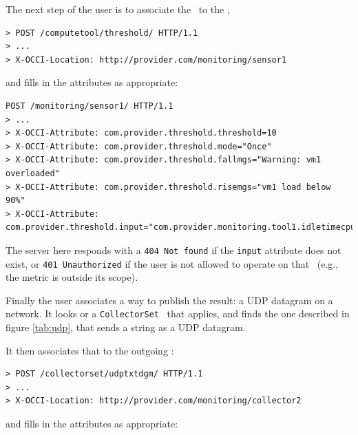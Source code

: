 \documentclass[12pt]{article}  %
\begin{document}
The next step of the user is to associate the \sens\ to the \mi,

\begin{verbatim}
> POST /computetool/threshold/ HTTP/1.1
> ...
> X-OCCI-Location: http://provider.com/monitoring/sensor1
\end{verbatim}
 
and fills in the attributes as appropriate:

\begin{verbatim}
POST /monitoring/sensor1/ HTTP/1.1
> ...
> X-OCCI-Attribute: com.provider.threshold.threshold=10
> X-OCCI-Attribute: com.provider.threshold.mode="Once"
> X-OCCI-Attribute: com.provider.threshold.fallmgs="Warning: vm1 overloaded"
> X-OCCI-Attribute: com.provider.threshold.risemgs="vm1 load below 90%"
> X-OCCI-Attribute: com.provider.threshold.input="com.provider.monitoring.tool1.idletimecpu"
\end{verbatim}

The server here responds with a {\tt 404 Not found} if the {\tt input} attribute does not exist, or {\tt 401 Unauthorized} if the user is not allowed to operate on that \rs\ (e.g., the metric is outside its scope).

Finally the user associates a way to publish the result: a UDP datagram on a network. It looks or a {\tt CollectorSet} \mi\ that applies, and finds the one described in figure \ref{tab:udp}, that sends a string as a UDP datagram.

\begin{table}
\scriptsize
{}

\caption{Attributes defined for the {\tt udptxtdgm} mixin \label{tab:udp}}
\end {table}

It then associates that \mi to the outgoing \coll:

{\scriptsize
\begin{verbatim}
> POST /collectorset/udptxtdgm/ HTTP/1.1
> ...
> X-OCCI-Location: http://provider.com/monitoring/collector2
\end{verbatim}
 }
and fills in the attributes as appropriate:
\end{document}
